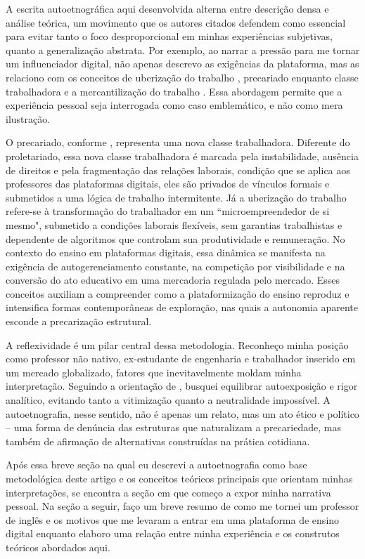 \documentclass[portuguese]{textolivre}
\begin{document}
A escrita autoetnográfica aqui desenvolvida alterna entre descrição densa e análise teórica, um movimento que os autores citados defendem como essencial para evitar tanto o foco desproporcional em minhas experiências subjetivas, quanto a generalização abstrata. Por exemplo, ao narrar a pressão para me tornar um influenciador digital, não apenas descrevo as exigências da plataforma, mas as relaciono com os conceitos de uberização do trabalho \cite{abilio2020}, precariado enquanto classe trabalhadora \cite{standing2014} e a mercantilização do trabalho \cite{harvey2014neoliberalismo}. Essa abordagem permite que a experiência pessoal seja interrogada como caso emblemático, e não como mera ilustração.

O precariado, conforme \textcite{standing2014}, representa uma nova classe trabalhadora. Diferente do proletariado, essa nova classe trabalhadora é marcada pela instabilidade, ausência de direitos e pela fragmentação das relações laborais, condição que se aplica aos professores das plataformas digitais, eles são privados de vínculos formais e submetidos a uma lógica de trabalho intermitente. Já a uberização do trabalho \cite{abilio2020} refere-se à transformação do trabalhador em um ``microempreendedor de si mesmo", submetido a condições laborais flexíveis, sem garantias trabalhistas e dependente de algoritmos que controlam sua produtividade e remuneração. No contexto do ensino em plataformas digitais, essa dinâmica se manifesta na exigência de autogerenciamento constante, na competição por visibilidade e na conversão do ato educativo em uma mercadoria regulada pelo mercado. Esses conceitos auxiliam a compreender como a plataformização do ensino reproduz e intensifica formas contemporâneas de exploração, nas quais a autonomia aparente esconde a precarização estrutural.

A reflexividade é um pilar central dessa metodologia. Reconheço minha posição como professor não nativo, ex-estudante de engenharia e trabalhador inserido em um mercado globalizado, fatores que inevitavelmente moldam minha interpretação. Seguindo a orientação de \textcite{adams2015}, busquei equilibrar autoexposição e rigor analítico, evitando tanto a vitimização quanto a neutralidade impossível. A autoetnografia, nesse sentido, não é apenas um relato, mas um ato ético e político -- uma forma de denúncia das estruturas que naturalizam a precariedade, mas também de afirmação de alternativas construídas na prática cotidiana.

Após essa breve seção na qual eu descrevi a autoetnografia como base metodológica deste artigo e os conceitos teóricos principais que orientam minhas interpretações, se encontra a seção em que começo a expor minha narrativa pessoal. Na seção a seguir, faço um breve resumo de como me tornei um professor de inglês e os motivos que me levaram a entrar em uma plataforma de ensino digital enquanto elaboro uma relação entre minha experiência e os construtos teóricos abordados aqui.
\end{document}
